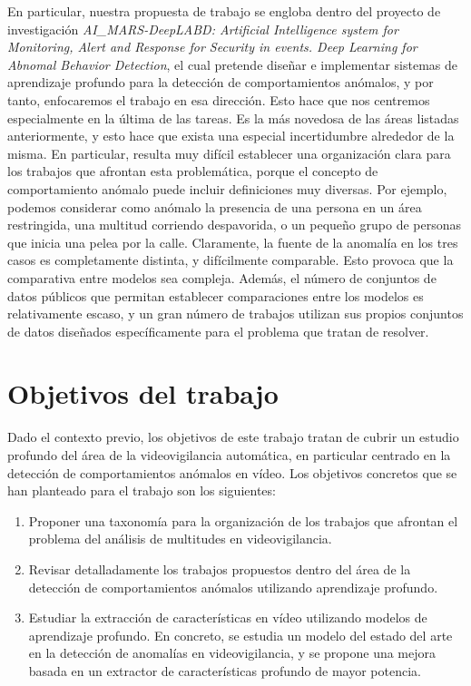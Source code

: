 \documentclass[../main.tex]{book}
\begin{document}
En particular, nuestra propuesta de trabajo se engloba dentro del
proyecto de investigación \textit{AI\_MARS-DeepLABD: Artificial
  Intelligence system for Monitoring, Alert and Response for Security
  in events. Deep Learning for Abnomal Behavior Detection}, el cual
pretende diseñar e implementar sistemas de aprendizaje profundo para
la detección de comportamientos anómalos, y por tanto, enfocaremos el
trabajo en esa dirección. Esto hace que nos centremos especialmente en
la última de las tareas. Es la más novedosa de las áreas listadas
anteriormente, y esto hace que exista una especial incertidumbre
alrededor de la misma. En particular, resulta muy difícil establecer
una organización clara para los trabajos que afrontan esta
problemática, porque el concepto de comportamiento anómalo puede
incluir definiciones muy diversas. Por ejemplo, podemos considerar
como anómalo la presencia de una persona en un área restringida, una
multitud corriendo despavorida, o un pequeño grupo de personas que
inicia una pelea por la calle. Claramente, la fuente de la anomalía en
los tres casos es completamente distinta, y difícilmente comparable.
Esto provoca que la comparativa entre modelos sea compleja. Además, el
número de conjuntos de datos públicos que permitan establecer
comparaciones entre los modelos es relativamente escaso, y un gran
número de trabajos utilizan sus propios conjuntos de datos diseñados
específicamente para el problema que tratan de resolver.\\

\section{Objetivos del trabajo}

Dado el contexto previo, los objetivos de este trabajo tratan de
cubrir un estudio profundo del área de la videovigilancia automática,
en particular centrado en la detección de comportamientos anómalos en
vídeo. Los objetivos concretos que se han planteado para el trabajo
son los siguientes:

\begin{enumerate}
\item Proponer una taxonomía para la organización de los trabajos que
  afrontan el problema del análisis de multitudes en videovigilancia.
\item Revisar detalladamente los trabajos propuestos dentro del área
  de la detección de comportamientos anómalos utilizando aprendizaje
  profundo.
\item Estudiar la extracción de características en vídeo utilizando
  modelos de aprendizaje profundo. En concreto, se estudia un modelo
  del estado del arte en la detección de anomalías en videovigilancia,
  y se propone una mejora basada en un extractor de características
  profundo de mayor potencia.
\end{enumerate}
\end{document}
